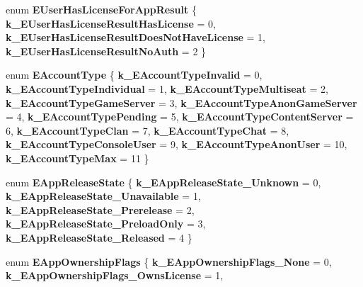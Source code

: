 \begin{DoxyCompactItemize}
\mbox{\label{namespace_valve_1_1_steamworks_a4551b19c96690358095d423a33d1337f}} 
enum {\bfseries E\+User\+Has\+License\+For\+App\+Result} \{ {\bfseries k\+\_\+\+E\+User\+Has\+License\+Result\+Has\+License} = 0, 
{\bfseries k\+\_\+\+E\+User\+Has\+License\+Result\+Does\+Not\+Have\+License} = 1, 
{\bfseries k\+\_\+\+E\+User\+Has\+License\+Result\+No\+Auth} = 2
 \}
\item 
\mbox{\label{namespace_valve_1_1_steamworks_a8b56516bb01d7d063627b4229106b155}} 
enum {\bfseries E\+Account\+Type} \{ \newline
{\bfseries k\+\_\+\+E\+Account\+Type\+Invalid} = 0, 
{\bfseries k\+\_\+\+E\+Account\+Type\+Individual} = 1, 
{\bfseries k\+\_\+\+E\+Account\+Type\+Multiseat} = 2, 
{\bfseries k\+\_\+\+E\+Account\+Type\+Game\+Server} = 3, 
\newline
{\bfseries k\+\_\+\+E\+Account\+Type\+Anon\+Game\+Server} = 4, 
{\bfseries k\+\_\+\+E\+Account\+Type\+Pending} = 5, 
{\bfseries k\+\_\+\+E\+Account\+Type\+Content\+Server} = 6, 
{\bfseries k\+\_\+\+E\+Account\+Type\+Clan} = 7, 
\newline
{\bfseries k\+\_\+\+E\+Account\+Type\+Chat} = 8, 
{\bfseries k\+\_\+\+E\+Account\+Type\+Console\+User} = 9, 
{\bfseries k\+\_\+\+E\+Account\+Type\+Anon\+User} = 10, 
{\bfseries k\+\_\+\+E\+Account\+Type\+Max} = 11
 \}
\item 
\mbox{\label{namespace_valve_1_1_steamworks_a3953f8d72dc8ecb870102445d1d17e4f}} 
enum {\bfseries E\+App\+Release\+State} \{ \newline
{\bfseries k\+\_\+\+E\+App\+Release\+State\+\_\+\+Unknown} = 0, 
{\bfseries k\+\_\+\+E\+App\+Release\+State\+\_\+\+Unavailable} = 1, 
{\bfseries k\+\_\+\+E\+App\+Release\+State\+\_\+\+Prerelease} = 2, 
{\bfseries k\+\_\+\+E\+App\+Release\+State\+\_\+\+Preload\+Only} = 3, 
\newline
{\bfseries k\+\_\+\+E\+App\+Release\+State\+\_\+\+Released} = 4
 \}
\item 
\mbox{\label{namespace_valve_1_1_steamworks_af66998371c545a5971dacc3a05e08bdd}} 
enum {\bfseries E\+App\+Ownership\+Flags} \{ \newline
{\bfseries k\+\_\+\+E\+App\+Ownership\+Flags\+\_\+\+None} = 0, 
{\bfseries k\+\_\+\+E\+App\+Ownership\+Flags\+\_\+\+Owns\+License} = 1, 

\end{DoxyCompactItemize}
